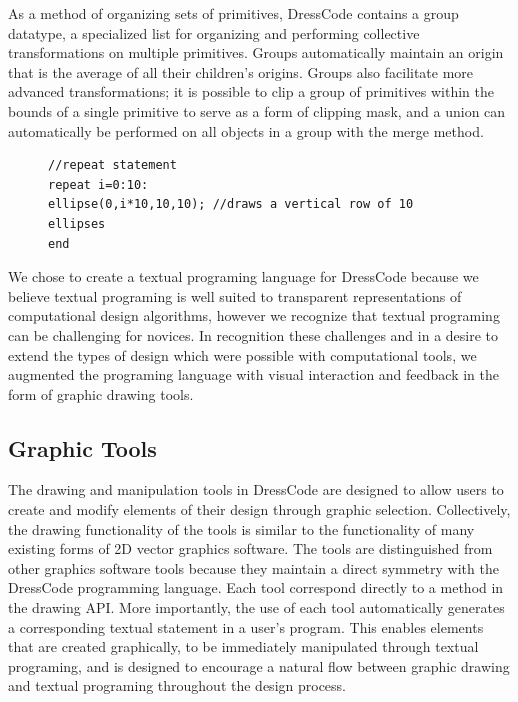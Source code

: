 \documentclass{sigchi}
\begin{document}
As a method of organizing sets of primitives, DressCode contains a group datatype, a specialized list for organizing and performing collective transformations on multiple primitives. Groups automatically maintain an origin that is the average of all their children's origins. Groups also facilitate more advanced transformations; it is possible to clip a group of primitives within the bounds of a single primitive to serve as a form of clipping mask, and a union can automatically be performed on all objects in a group with the merge method.
 \begin{center}
\begin{figure}
\begin{lstlisting}
//repeat statement
repeat i=0:10:
ellipse(0,i*10,10,10); //draws a vertical row of 10 ellipses
end
\end{lstlisting}
\end{figure}
\end{center}
We chose to create a textual programing language for DressCode because we believe textual programing is well suited to transparent representations of computational design algorithms, however we recognize that textual programing can be challenging for novices. In recognition these challenges and in a desire to extend the types of design which were possible with computational tools, we augmented the programing language with visual interaction and feedback in the form of graphic drawing tools.
 
\subsection{Graphic Tools}
\label{subsec:graphic_tools_test}
The drawing and manipulation tools in DressCode are designed to allow users to create and modify elements of their design through graphic selection. Collectively, the drawing functionality of the tools is similar to the functionality of many existing forms of  2D vector graphics software. The tools are distinguished from other graphics software tools because they maintain a direct symmetry with the DressCode programming language. Each tool correspond directly to a method in the drawing API. More importantly, the use of each tool automatically generates a corresponding textual statement in a user's program. This enables elements that are created graphically, to be immediately manipulated through textual programing, and is designed to encourage a natural flow between graphic drawing and textual programing throughout the design process. 
\end{document}
